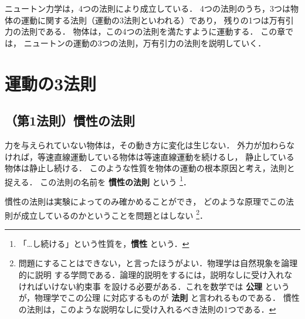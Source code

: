\begin{mycomment}
    ニュートン力学は，4つの法則により成立している．
    4つの法則のうち，3つは物体の運動に関する法則（運動の3法則といわれる）であり，
    残りの1つは万有引力の法則である．
    物体は，この4つの法則を満たすように運動する．
    この章では，
    ニュートンの運動の3つの法則，万有引力の法則を説明していく．
\end{mycomment}
    \section{運動の3法則}
  \subsection{（第1法則）慣性の法則}
                力を与えられていない物体は，その動き方に変化は生じない．
                外力が加わらなければ，等速直線運動している物体は等速直線運動を続けるし，
                静止している物体は静止し続ける．
                このような性質を物体の運動の根本原因と考え，法則と捉える．
                この法則の名前を \textbf{慣性の法則} という
                \footnote{
                  「…し続ける」という性質を，\textbf{慣性} という．
                }．

                慣性の法則は実験によってのみ確かめることができ，
                どのような原理でこの法則が成立しているのかということを問題とはしない
                  \footnote{
                    問題にすることはできない，と言ったほうがよい．物理学は自然現象を論理的に説明
                    する学問である．論理的説明をするには，説明なしに受け入れなければいけない約束事
                    を設ける必要がある．これを数学では \textbf{公理} というが，物理学でこの公理
                    に対応するものが \textbf{法則} と言われるものである．
                    慣性の法則は，このような説明なしに受け入れるべき法則の1つである．
                  }．

